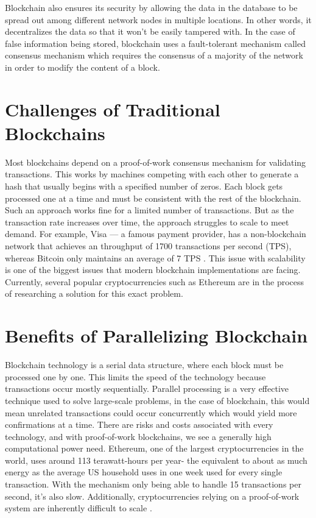 Blockchain also ensures its security by allowing the data in the database to be spread out among different network nodes in multiple locations. In other words, it decentralizes the data so that it won’t be easily tampered with. In the case of false information being stored, blockchain uses a fault-tolerant mechanism called consensus mechanism 
which requires the consensus of a majority of the network in order to modify the content of a block.

\section{Challenges of Traditional Blockchains}

Most blockchains depend on a proof-of-work consensus mechanism for validating transactions. This works by machines competing with each other to generate a hash that usually begins with a specified number of zeros. Each block gets processed one at a time and must be consistent with the rest of the blockchain. Such an approach works fine for a limited number of transactions. But as the transaction rate increases over time, the approach struggles to scale to meet demand. For example, Visa — a famous payment provider, has a non-blockchain network that achieves an throughput of 1700 transactions per second (TPS), whereas Bitcoin only maintains an average of 7 TPS \cite{towardsdatascience}. This issue with scalability is one of the biggest issues that modern blockchain implementations are facing. Currently, several popular cryptocurrencies such as Ethereum are in the process of researching a solution for this exact problem.

\section{Benefits of Parallelizing Blockchain}

Blockchain technology is a serial data structure, where each block must be processed one by one. This limits the speed of the technology because transactions occur mostly sequentially. Parallel processing is a very effective technique used to solve large-scale problems, in the case of blockchain, this would mean unrelated transactions could occur concurrently which would yield more confirmations at a time. 
There are risks and costs associated with every technology, and with proof-of-work blockchains, we see a generally high computational power need. Ethereum, one of the largest cryptocurrencies in the world, uses around 113 terawatt-hours per year- the equivalent to about as much energy as the average US household uses in one week used for every single transaction. With the mechanism only being able to handle 15 transactions per second, it’s also slow. Additionally, cryptocurrencies relying on a proof-of-work system are inherently difficult to scale \cite{ethereum.org2}.

